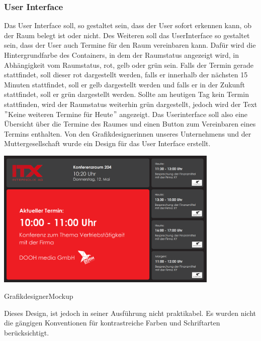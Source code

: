 \subsubsection{User Interface}\label{subsec:user-interface}
Das User Interface soll, so gestaltet sein, dass der User sofort erkennen kann, ob der Raum belegt ist oder nicht.
Des Weiteren soll das \gls{UserInterface} so gestaltet sein, dass der User auch Termine für den Raum vereinbaren kann.
Dafür wird die Hintergrundfarbe des Containers, in dem der Raumstatus angezeigt wird, in Abhängigkeit vom Raumstatus, rot, gelb oder grün sein.
Falls der Termin gerade stattfindet, soll dieser rot dargestellt werden, falls er innerhalb der nächsten 15 Minuten stattfindet, soll er gelb dargestellt werden und falls er in der Zukunft stattfindet, soll er grün dargestellt werden.
Sollte am heutigen Tag kein Termin stattfinden, wird der Raumstatus weiterhin grün dargestellt, jedoch wird der Text \("\)Keine weiteren Termine für Heute\("\) angezeigt.
Das Userinterface soll also eine Übersicht über die Termine des Raumes und einen Button zum Vereinbaren eines Termins enthalten.
\newline
Von den Grafikdesignerinnen unseres Unternehmens und der Muttergesellschaft wurde ein Design für das User Interface erstellt.
\newline
\newline
\par\vspace{1cm}
\centering
\includegraphics[width=0.8\textwidth]{Bilder/GrafikdesignerMockup}
\caption{GrafikdesignerMockup}
\label{fig:GrafikdesignerMockup}
\par\vspace{1cm}
\raggedright
Dieses Design, ist jedoch in seiner Ausführung nicht praktikabel.
Es wurden nicht die gängigen Konventionen für kontrastreiche Farben und Schriftarten berücksichtigt.
